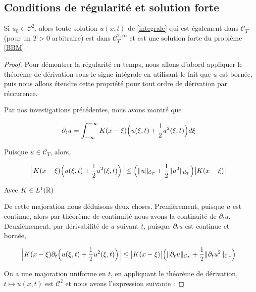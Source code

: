 \subsection{Conditions de régularité et solution forte}

\begin{lemmabox}
\begin{lemma} \label{lemme 2}
    Si $u_0 \in \mathcal{C}^2$, alors toute solution $u(x,t)$ de \ref{integrale} qui est également dans $\mathcal{C}_{T}$ (pour un $T>0$ arbitraire) est 
    dans $\mathcal{C}_T ^{2,\infty}$ et est une solution forte du problème \ref{BBM}.
\end{lemma}
\end{lemmabox}

\begin{proof}
    
    Pour démontrer la régularité en temps, nous allons d'abord appliquer le théorème de dérivation sous le signe 
    intégrale en utilisant le fait que $u$ est bornée, puis nous allons étendre cette propriété pour tout ordre de dérivation par réccurence.

    \vspace{1em}
    Par nos investigations précédentes, nous avons montré que 

    $$\partial_t u = \int_{-\infty}^{+\infty} K(x-\xi) \Bigl( u(\xi,t) + \frac{1}{2}u^2(\xi,t) \Bigr) d\xi$$

    Puisque $u \in \mathcal{C}_T$, alors,

    $$ \Big| K(x-\xi) \Bigl( u(\xi,t) + \frac{1}{2}u^2(\xi,t) \Bigr) \Big| \leq \Bigl( \|u\|_{\mathcal{C}_T} + \frac{1}{2}\|u^2\|_{\mathcal{C}_T} \Bigr) \big| K(x-\xi) \big|$$

    Avec $K \in L^1(\mathbb{R})$

    De cette majoration nous déduisons deux choses. Premièrement, puisque $u$ est continue, alors par théorème de continuité
    nous avons la continuité de $\partial_t u$. Deuxièmement, par dérivabilité de $u$ suivant $t$, puisque $\partial_t u$ est continue et bornée, 

    $$\Big| K(x - \xi) \partial_t \Bigl( u(\xi,t) + \frac{1}{2} u^2(\xi,t) \Bigr)\Big| \leq \big| K(x -\xi) \big| \Bigl( \|\partial_t u\|_{\mathcal{C}_T} + \frac{1}{2}\|\partial_t u^2\|_{\mathcal{C}_T} \Bigr) $$
    
    On a une majoration uniforme en $t$, en appliquant le théorème de 
    dérivation, $t \mapsto u(x,t)$ est $\mathcal{C}^2$ et nous avons l'expression suivante :


\end{proof}
